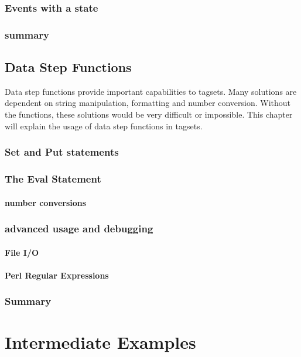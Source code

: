 \documentclass{book}
\begin{document}
\section{Events with a state}

\section{summary}

\chapter{Data Step Functions}
Data step functions provide important capabilities to tagsets.  Many
solutions are dependent on string manipulation, formatting and 
number conversion.  Without the functions, these solutions would
be very difficult or impossible.  This chapter will explain the usage
of data step functions in tagsets.
\section{Set and Put statements}

\section{The Eval Statement}

\subsection{number conversions}

\section{advanced usage and debugging}

\subsection{File I/O}

\subsection{Perl Regular Expressions}

\section{Summary}

\part{Intermediate Examples}
\end{document}
